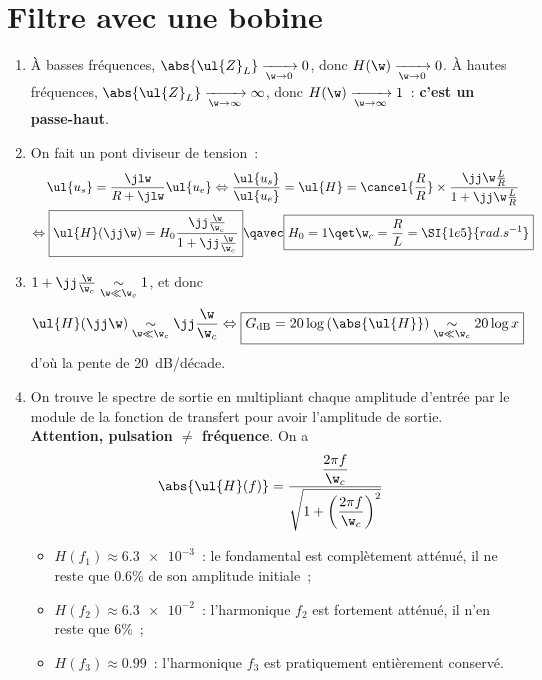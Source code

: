 \documentclass[a4paper, 12pt, final, garamond]{book}
\begin{document}
\section{Filtre avec une bobine}
\begin{enumerate}
    \item À basses fréquences, $\abs{\ul{Z}_L} \xrightarrow[\w\rightarrow0]{} 0$, donc
        $H(\w) \xrightarrow[\w\rightarrow0]{} 0$. À hautes fréquences,
        $\abs{\ul{Z}_L} \xrightarrow[\w\rightarrow\infty]{} \infty$, donc
        $H(\w) \xrightarrow[\w\rightarrow\infty]{} 1$~: \textbf{c'est un
        passe-haut}.
    \item On fait un pont diviseur de tension~:
        \begin{gather*}
            \ul{u_s} = \frac{\jlw}{R + \jlw}\ul{u_e}
            \Leftrightarrow
            \frac{\ul{u_s}}{\ul{u_e}} = \ul{H} =
            \cancel{\frac{R}{R}}\times\frac{\jj\w\frac{L}{R}}{1 + \jj\w
            \frac{L}{R}}\\
            \Leftrightarrow
            \boxed{\ul{H}(\jj\w) = H_0 \frac{\jj\frac{\w}{\w_c}}{1 +
            \jj\frac{\w}{\w_c}}}
            \qavec
            \boxed{H_0 = 1
            \qet
            \w_c = \frac{R}{L} = \SI{1e5}{rad.s^{-1}}}
        \end{gather*}
    \item $1 + \jj \frac{\w}{\w_c} \underset{\w \ll \w_c}{\sim} 1$, et donc
        \begin{gather*}
            \ul{H}(\jj\w) \underset{\w\ll\w_c}{\sim} \jj \frac{\w}{\w_c}
            \Leftrightarrow
            \boxed{G_{\rm dB} = 20\log \left( \abs{\ul{H}} \right)
            \underset{\w\ll\w_c}{\sim} 20\log x}
        \end{gather*}
        d'où la pente de \SI{20}{dB/décade}.
    \item On trouve le spectre de sortie en multipliant chaque amplitude
        d'entrée par le module de la fonction de transfert pour avoir
        l'amplitude de sortie. \textbf{Attention, pulsation $\neq$ fréquence}.
        On a
        \[\abs{\ul{H}(f)} = \frac{\dfrac{2\pi f}{\w_c}}{\sqrt{1 +
                    \left( \dfrac{2\pi f}{\w_c} \right)^2}}\]
        \begin{itemize}
            \item $H(f_1) \approx \num{6.3e-3}$~: le fondamental est
                complètement atténué, il ne reste que \num{0.6}\% de son
                amplitude initiale~;
            \item $H(f_2) \approx \num{6.3e-2}$~: l'harmonique $f_2$ est
                fortement atténué, il n'en reste que 6\%~;
            \item $H(f_3) \approx \num{0.99}$~: l'harmonique $f_3$ est
                pratiquement entièrement conservé.
        \end{itemize}
\end{enumerate}
\end{document}
